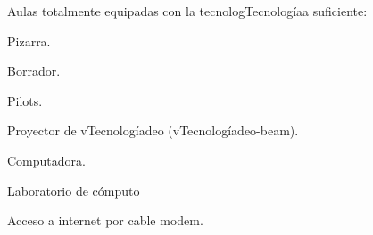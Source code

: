 \begin{syllabus}
\begin{didactical-resources}
Aulas totalmente equipadas con la tecnologTecnologíaa suficiente:

\begin{inparaenum}[ \bf I:]
\item Pizarra.
\item Borrador.
\item Pilots.
\item Proyector de vTecnologíadeo (vTecnologíadeo-beam).
\item Computadora.
\item Laboratorio de cómputo
\item Acceso a internet por cable modem.
\end{inparaenum}

\end{didactical-resources}


\begin{coursebibliography}
\end{coursebibliography}

\end{syllabus}
